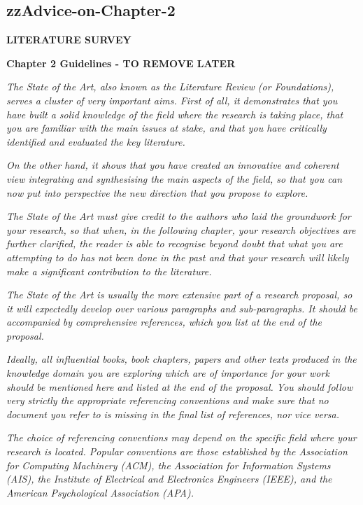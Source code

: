 \pagebreak
\begin{tcolorbox}
	
\section{zzAdvice-on-Chapter-2}
	
\textbf{LITERATURE SURVEY}
\vspace*{1\baselineskip}

\textbf{Chapter 2 Guidelines - TO REMOVE LATER}	
\vspace*{1\baselineskip}
	
\textit{The State of the Art, also known as the Literature Review (or Foundations), serves a cluster of very important aims. First of all, it demonstrates that you have built a solid knowledge of the field where the research is taking place, that you are familiar with the main issues at stake, and that you have critically identified and evaluated the key literature.} 
\vspace*{1\baselineskip}

\textit{On the other hand, it shows that you have created an innovative and coherent view integrating and synthesising the main aspects of the field, so that you can now put into perspective the new direction that you propose to explore. }
\vspace*{1\baselineskip}

\textit{The State of the Art must give credit to the authors who laid the groundwork for your research, so that when, in the following chapter, your research objectives are further clarified, the reader is able to recognise beyond doubt that what you are attempting to do has not been done in the past and that your research will likely make a significant contribution to the literature.}
\vspace*{1\baselineskip}

\textit{The State of the Art is usually the more extensive part of a research proposal, so it will expectedly develop over various paragraphs and sub-paragraphs. It should be accompanied by comprehensive references, which you list at the end of the proposal.} 
\vspace*{1\baselineskip}
	
\textit{Ideally, all influential books, book chapters, papers and other texts produced in the knowledge domain you are exploring which are of importance for your work should be mentioned here and listed at the end of the proposal. You should follow very strictly the appropriate referencing conventions and make sure that no document you refer to is missing in the final list of references, nor vice versa.}
\vspace*{1\baselineskip}

\textit{The choice of referencing conventions may depend on the specific field where your research is located. Popular conventions are those established by the Association for Computing Machinery (ACM), the Association for Information Systems (AIS), the Institute of Electrical and Electronics Engineers (IEEE), and the American Psychological Association (APA).}
\vspace*{1\baselineskip}


\end{tcolorbox}
